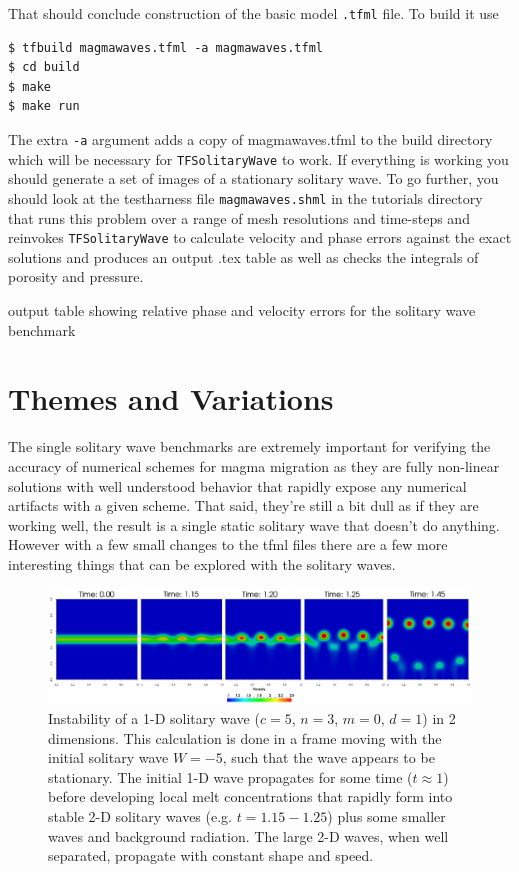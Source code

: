 That should conclude construction of the basic model \texttt{.tfml}
file.  To build it use
\begin{lstlisting}[style=Bash]
$ tfbuild magmawaves.tfml -a magmawaves.tfml
$ cd build
$ make
$ make run 
\end{lstlisting}
The extra \texttt{-a} argument adds a copy of magmawaves.tfml to the
build directory which will be necessary for \texttt{TFSolitaryWave} to
work.  If everything is working you should generate a set of images of a
stationary solitary wave.  To go further, you should look at the
testharness file \texttt{magmawaves.shml} in the tutorials directory
that runs this problem over a range of mesh resolutions and time-steps
and reinvokes \texttt{TFSolitaryWave} to calculate velocity and phase
errors against the exact solutions and produces an output .tex table
as well as checks the integrals of porosity and pressure.
\begin{table}[h]
  \centering
  \caption{output table showing relative phase and velocity errors for the
    solitary wave benchmark}
  \label{benchmark_table}
  
\end{table}


\section{Themes and Variations}

The single solitary wave benchmarks are extremely important for
verifying the accuracy of numerical schemes for magma migration as
they are fully non-linear solutions with well understood behavior that
rapidly expose any numerical artifacts with a given scheme.  That
said,  they're still a bit dull as if they are working well,  the
result is a single static solitary wave that doesn't do anything.
However with a few small changes to the tfml files  there are a few
more interesting things that can be explored with the solitary waves. 

\begin{figure}[htbp!]
  \centering
  \includegraphics[width=\textwidth]{figures/1dto2d.pdf}
  \caption{Instability of a 1-D solitary wave ($c=5$, $n=3$, $m=0$,
    $d=1$) in 2 dimensions. This calculation is done in a frame moving
    with the initial solitary wave $W=-5$, such that the wave appears
    to be stationary. The initial 1-D wave propagates for some time
    ($t\approx 1$) before developing local melt concentrations that
    rapidly form into stable 2-D solitary waves (e.g. $t=1.15-1.25$)
    plus some smaller waves and background radiation.  The large 2-D
    waves, when well separated, propagate with constant shape and speed.}
  \label{fig:1dto2d}
\end{figure}

